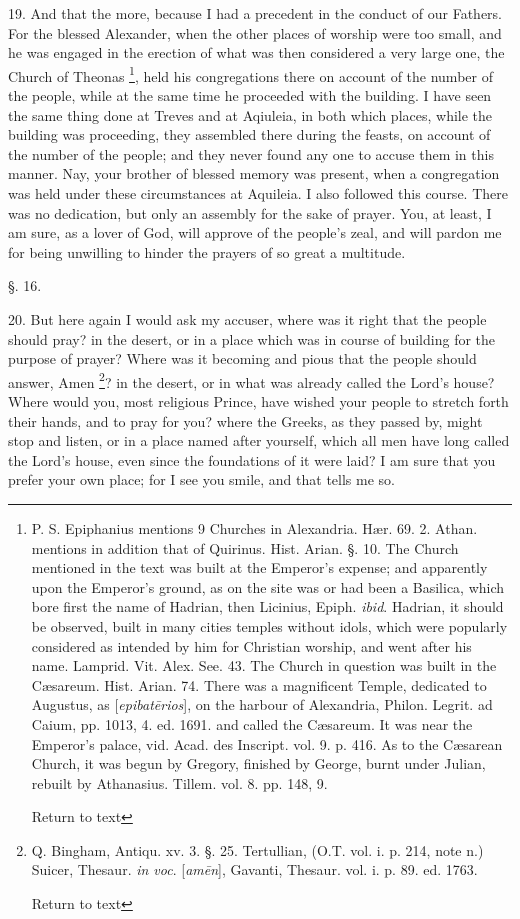 19. And that the more, because I had a precedent in the conduct of our
Fathers. For the blessed Alexander, when the other places of worship
were too small, and he was engaged in the erection of what was then
considered a very large one, the Church of Theonas \footnote{P. S. Epiphanius mentions 9 Churches in Alexandria. Hær. 69. 2. Athan.
mentions in addition that of Quirinus. Hist. Arian. §. 10. The Church
mentioned in the text was built at the Emperor's expense; and
apparently upon the Emperor's ground, as on the site was or had been a
Basilica, which bore first the name of Hadrian, then Licinius, Epiph. \emph{ibid}. Hadrian, it should be observed, built in many
cities temples without idols, which were popularly considered as
intended by him for Christian worship, and went after his name.
Lamprid. Vit. Alex. See. 43. The Church in question was built in the Cæsareum.
Hist. Arian. 74. There was a magnificent Temple, dedicated to
Augustus, as [\emph{epibat\={e}rios}],
on the harbour of Alexandria, Philon. Legrit. ad Caium, pp. 1013, 4.
ed. 1691. and called the Cæsareum. It was near the Emperor's palace,
vid. Acad. des Inscript. vol. 9. p. 416. As to the Cæsarean Church,
it was begun by Gregory, finished by George, burnt under Julian,
rebuilt by Athanasius. Tillem. vol. 8. pp. 148, 9.

Return to text}, held his congregations there on account of the number of the
people, while at the same time he proceeded with the building. I have
seen the same thing done at Treves and at Aqiuleia, in both which
places, while the building was proceeding, they assembled there during
the feasts, on account of the number of the people; and they never
found any one to accuse them in this manner. Nay, your brother of
blessed memory was present, when a congregation was held under these
circumstances at Aquileia. I also followed this course. There was no
dedication, but only an assembly for the sake of prayer. You, at
least, I am sure, as a lover of God, will approve of the people's
zeal, and will pardon me for being unwilling to hinder the prayers of
so great a multitude.

§. 16.

20. But here again I would ask my accuser, where was it right that the
people should pray? in the desert, or in a place which was in course
of building for the purpose of prayer? Where was it becoming and pious
that the people should answer, Amen \footnote{Q. Bingham, Antiqu. xv. 3. §. 25. Tertullian, (O.T. vol. i. p. 214,
note n.) Suicer, Thesaur. \emph{in
voc}. [\emph{am\={e}n}], Gavanti, Thesaur. vol. i. p. 89. ed. 1763.

Return to text}? in the desert, or in what was already called the Lord's house?
Where would you, most religious Prince, have wished your people to
stretch forth their hands, and to pray for you? where the Greeks, as
they passed by, might stop and listen, or in a place named after
yourself, which all men have long called the Lord's house, even since
the foundations of it were laid? I am sure that you prefer your own
place; for I see you smile, and that tells me so.

